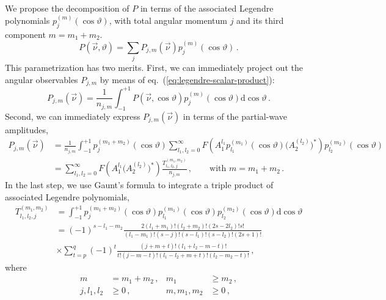 \documentclass[aps,prd,reprint,nofootinbib,preprintnumbers]{revtex4}
\newcommand{\dd}{\text{d}}
\newcommand{\refeq}[1]{eq.~(\ref{eq:#1})}
\renewcommand{\theta}{\vartheta}
\begin{document}
We propose the decomposition of $P$ in terms of the associated Legendre polynomials $p_{j}^{(m)}(\cos\theta)$, with total angular momentum $j$ and its third component $m=m_1 + m_2$.
\begin{equation}
    P(\vec{\nu}, \theta) = \sum_j P_{j,m}(\vec{\nu}) p_{j}^{(m)}(\cos\theta)\,.
\end{equation}
This parametrization has two merits. First, we can immediately project out the angular observables $P_{j,m}$ by means of \refeq{legendre-scalar-product}:
\begin{equation}
    P_{j,m}(\vec{\nu}) = \frac{1}{n_{j,m}} \int_{-1}^{+1} P(\vec{\nu},\cos \theta) p_{j}^{(m)}(\cos\theta) \dd\cos\theta\,.
\end{equation}
Second, we can immediately express $P_{j,m}(\vec{\nu})$ in terms of the partial-wave amplitudes,
\begin{equation}
    \label{eq:partial-wave-observable-infinite}
    \begin{aligned}
        P_{j,m}(\vec{\nu})
            & = \frac{1}{n_{j,m}} \int_{-1}^{+1} p_{j}^{(m_1 + m_2)}(\cos\theta) \sum_{l_1,l_2=0}^\infty F\left(A_{1}^{l_1} p_{l_1}^{(m_1)}(\cos\theta) \big(A_{2}^{(l_2)}\big)^*\right) p_{l_2}^{(m_2)}(\cos\theta)\\
            & = \sum_{l_1,l_2=0}^\infty F\left(A_{1}^{l_1} \big(A_{2}^{(l_2)}\big)^*\right) \frac{T_{l_1,l_2,j}^{(m_1,m_2)}}{n_{j,m}}\,,\qquad\text{with }m = m_1 + m_2\,.
    \end{aligned}
\end{equation}
In the last step, we use Gaunt's formula \cite{Gaunt:1929} to integrate a triple product of associated Legendre polynomials,
\begin{equation}
\begin{aligned}
    T_{l_1,l_2,j}^{(m_1,m_2)}
        & = \int_{-1}^{+1} p_{j}^{(m_1 + m_2)}(\cos\theta) p_{l_1}^{(m_1)}(\cos\theta) p_{l_2}^{(m_2)}(\cos\theta) \dd\cos\theta\\
        & = (-1)^{s - l_1 - m_2} \frac{2 (l_1 + m_1)! (l_2 + m_2)! (2s - 2 l_2)! s!}{(l_1 - m_1)! (s - j)! (s - l_1)! (s - l_2)! (2s + 1)!}\\
        & \times \sum_{t=p}^q (-1)^t \frac{(j + m + t)!(l_1 + l_2 - m - t)!}{t! (j - m - t)! (l_1 - l_2 + m + t)! (l_2 - m_2 - t)!}\,,
\end{aligned}
\end{equation}
where
\begin{equation}
\begin{aligned}
    m & = m_1 + m_2\,, &
    m_1 & \geq m_2\,,  \\
    j, l_1, l_2 & \geq 0\,, &
    m, m_1, m_2 & \geq 0\,,
\end{aligned}
\end{equation}
\end{document}
